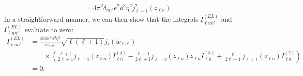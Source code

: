 \begin{equation}
\begin{split}
&= 4\pi^2\delta_{nn'}e^2a^3\eta^2j_{\ell - 1}^2(z_{\ell n}).
\end{split}
\end{equation}
In a straightforward manner, we can then show that the integrals $I_{\ell nn'}^{(EL)}$ and $I_{\ell nn'}^{(EL)}$ evaluate to zero:
\begin{equation}
\begin{split}
I_{\ell nn'}^{(EL)} &= \frac{16\pi e^2a^3\eta^2}{w_{\ell n'}}\sqrt{\ell(\ell + 1)}j_\ell(w_{\ell n'})\\
&\qquad\times\left(\frac{\ell + 1}{2\ell + 1}j_{\ell - 1}(z_{\ell n})I_{\ell n}^{(4)} - \frac{\ell + 1}{2\ell + 1}j_{\ell - 2}(z_{\ell n})z_{\ell n}I_{\ell n}^{(3)} + \frac{\ell}{2\ell + 1}j_{\ell + 1}(z_{\ell n})I_{\ell n}^{(2)}\right)\\
&= 0,
\end{split}
\end{equation}
